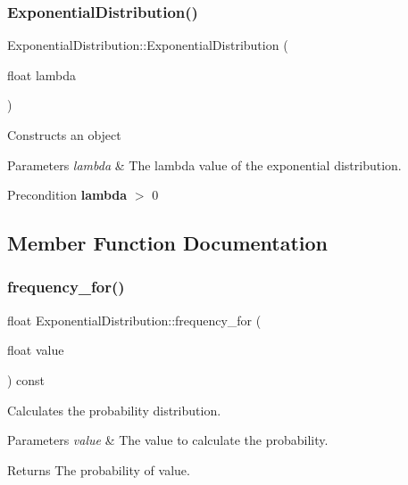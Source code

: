 \subsubsection{\texorpdfstring{Exponential\+Distribution()}{ExponentialDistribution()}}
{\footnotesize\ttfamily Exponential\+Distribution\+::\+Exponential\+Distribution (\begin{DoxyParamCaption}\item[{float}]{lambda }\end{DoxyParamCaption})\hspace{0.3cm}{\ttfamily [inline]}}

Constructs an object 
\begin{DoxyParams}{Parameters}
{\em lambda} & The lambda value of the exponential distribution. \\
\hline
\end{DoxyParams}
\begin{DoxyPrecond}{Precondition}
{\bfseries lambda} $>$ 0 
\end{DoxyPrecond}


\subsection{Member Function Documentation}
\mbox{\label{classExponentialDistribution_a3299605c567141253eb32891f19ccef8}} 
\subsubsection{\texorpdfstring{frequency\+\_\+for()}{frequency\_for()}}
{\footnotesize\ttfamily float Exponential\+Distribution\+::frequency\+\_\+for (\begin{DoxyParamCaption}\item[{float}]{value }\end{DoxyParamCaption}) const\hspace{0.3cm}{\ttfamily [virtual]}}

Calculates the probability distribution. 
\begin{DoxyParams}{Parameters}
{\em value} & The value to calculate the probability. \\
\hline
\end{DoxyParams}
\begin{DoxyReturn}{Returns}
The probability of value. 
\end{DoxyReturn}


